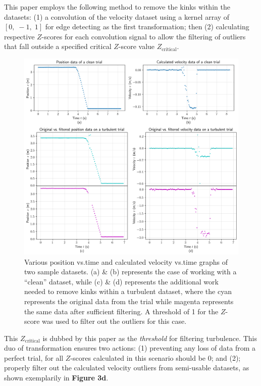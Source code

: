 \documentclass[12pt]{article}
\begin{document}
\begin{multicols}{2}
This paper employs the following method to remove the kinks within the datasets:
(1) a convolution of the velocity dataset using a kernel array of $[0,\;-1,\;1]$ for edge detecting as the first transformation;
then (2) calculating respective $Z$-scores for each convolution signal to allow the filtering of outliers that fall outside a specified critical $Z$-score value $Z_\text{critical}$.
\begin{figure}[H]
    \centering
    \includegraphics[width=0.98\linewidth]{figs/figure3.png}
    \caption{
        Various position vs.\;time and calculated velocity vs.\;time graphs of two sample datasets.
        (a) \& (b) represents the case of working with a ``clean'' dataset,
        while (c) \& (d) represents the additional work needed to remove kinks within a turbulent dataset,
        where the cyan represents the original data from the trial while magenta represents the same data after sufficient filtering.
        A threshold of 1 for the $Z$-score was used to filter out the outliers for this case.
    }
    \label{fig:3}
\end{figure}
\noindent
This $Z_\text{critical}$ is dubbed by this paper as the \textit{threshold} for filtering turbulence.
This duo of transformation ensures two actions:
(1) preventing any loss of data from a perfect trial, for all $Z$-scores calculated in this scenario should be 0;
and (2); properly filter out the calculated velocity outliers from semi-usable datasets, as shown exemplarily in \textbf{Figure 3d}.

\end{multicols}
\end{document}
